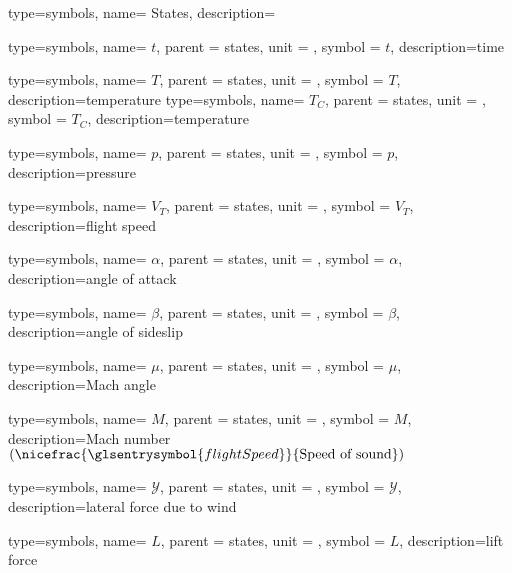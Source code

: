{type=symbols,
	name= {States},
	description={}
}

{type=symbols,
	name= \ensuremath{t},
	parent = {states},
	unit = \unexpanded{\si{\second}},
	symbol = \ensuremath{t},
	description={time}
}

{type=symbols,
	name= \ensuremath{T},
	parent = {states},
	unit = \unexpanded{\si{\kelvin}},
	symbol = \ensuremath{T},
	description={temperature}
}
{type=symbols,
	name= \ensuremath{T_{C}},
	parent = {states},
	unit = \unexpanded{\si{\celsius}},
	symbol = \ensuremath{T_{C}},
	description={temperature}
}

{type=symbols,
	name= \ensuremath{p},
	parent = {states},
	unit = \unexpanded{\si{\pascal}},
	symbol = \ensuremath{p},
	description={pressure}
}

{type=symbols,
	name= \ensuremath{V_{T}},
	parent = {states},
	unit = \unexpanded{\si{\meter\per\second}},
	symbol = \ensuremath{V_{T}},
	description={flight speed}
}

{type=symbols,
	name= \ensuremath{\alpha},
	parent = {states},
	unit = \unexpanded{\si{\radian}},
	symbol = \ensuremath{\alpha},
	description={angle of attack}
}

{type=symbols,
	name= \ensuremath{\beta},
	parent = {states},
	unit = \unexpanded{\si{\radian}},
	symbol = \ensuremath{\beta},
	description={angle of sideslip}
}


{type=symbols,
	name= \ensuremath{\mu},
	parent = {states},
	unit = \unexpanded{\si{\radian}},
	symbol = \ensuremath{\mu},
	description={Mach angle}
}

{type=symbols,
	name= \ensuremath{M},
	parent = {states},
	unit = \unexpanded{},
	symbol = \ensuremath{M},
	description={Mach number $(\nicefrac{\glsentrysymbol{flightSpeed}}{\text{Speed of sound}})$}
}

{type=symbols,
	name= \ensuremath{\mathcal{Y}},
	parent = {states},
	unit = \unexpanded{\si{\newton}},
	symbol = \ensuremath{\mathcal{Y}},
	description={lateral force due to wind}
}

{type=symbols,
	name= \ensuremath{L},
	parent = {states},
	unit = \unexpanded{\si{\newton}},
	symbol = \ensuremath{L},
	description={lift force}
}

